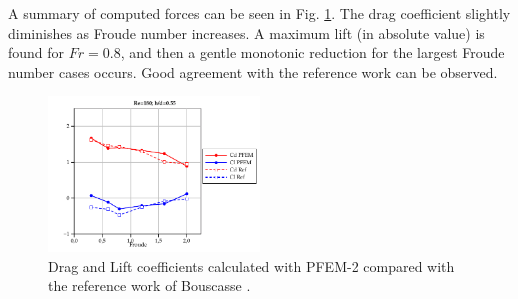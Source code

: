 A summary of computed forces can be seen in Fig. \ref{fg:CdCl}. The drag coefficient slightly diminishes as Froude number increases. A maximum lift (in absolute value) is found for $Fr = 0.8$, and then a gentle monotonic reduction for the largest Froude number cases occurs. Good agreement with the reference work can be observed.

\begin{figure}[ht]
  \centering
  \includegraphics[width=0.5\textwidth]{images_10thspheric/CdCl_cylinder_surface.pdf}
  \caption{Drag and Lift coefficients calculated with PFEM-2 compared with the reference work of Bouscasse \cite{Bouscasse14}.}
  \label{fg:CdCl}
\end{figure}
